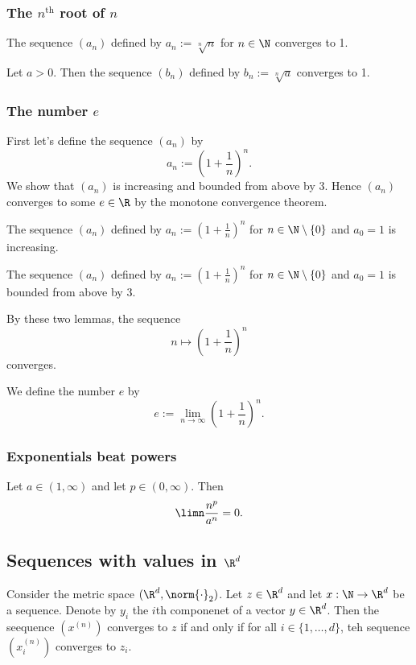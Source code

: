 \subsubsection{The $n^{\text{th}}$ root of $n$}
\begin{proposition}
    The sequence $(a_n)$ defined by $a_n := \sqrt[n]{n}$ for $n \in \N$ converges to 1.
\end{proposition}

\begin{corollary}
    Let $a > 0$. Then the sequence $(b_n)$ defined by $b_n := \sqrt[n]{a}$ converges to 1.
\end{corollary}

\subsubsection{The number $e$}
First let's define the sequence $(a_n)$ by
$$a_n := \left(1 + \frac{1}{n}\right)^n.$$
We show that $(a_n)$ is increasing and bounded from above by $3$. Hence $(a_n)$ converges to some $e \in \R$ by the monotone convergence theorem.
\begin{lemma}
    The sequence $(a_n)$ defined by $a_n := \left(1 + \frac{1}{n}\right)^n$ for $n \in \N \setminus \{0\}$ and $a_0 = 1$ is increasing.
\end{lemma}

\begin{lemma}
    The sequence $(a_n)$ defined by $a_n := \left(1 + \frac{1}{n}\right)^n$ for $n \in \N \setminus \{0\}$ and $a_0 = 1$ is bounded from above by 3.
\end{lemma}

By these two lemmas, the sequence
$$n \mapsto \left(1 + \frac{1}{n}\right)^n$$
converges.

\begin{definition}
    We define the number $e$ by
    $$e := \lim_{n\to\infty}\left(1 + \frac{1}{n}\right)^n.$$
\end{definition}

\subsubsection{Exponentials beat powers}
\begin{proposition}
    Let $a \in (1,\infty)$ and let $p \in (0,\infty)$. Then
    $$\limn\frac{n^p}{a^n} = 0.$$
\end{proposition}

\subsection{Sequences with values in $\R^d$}
\begin{proposition}
    Consider the metric space $(\R^d, \norm{\cdot}_2)$. Let $z \in \R^d$ and let $x: \N \to \R^d$ be a sequence. Denote by $y_i$ the $i$th componenet of a vector $y \in \R^d$. Then the seequence $(x^{(n)})$ converges to $z$ if and only if for
    all $i \in \{1,\dots, d\}$, teh sequence $(x_i^{(n)})$ converges to $z_i$.
\end{proposition}


